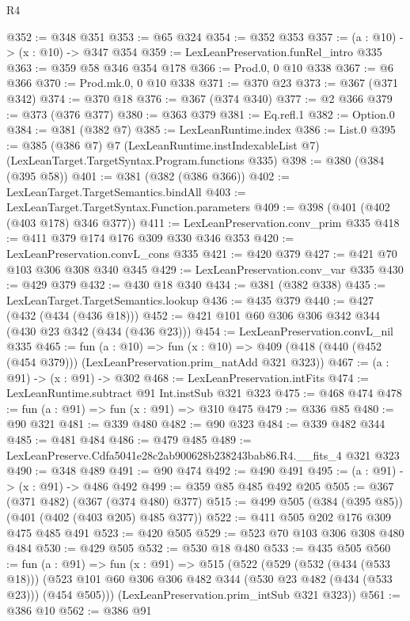 \begin{lexlean}{R4}
\begin{coremodule}
@352 := @348 @351
@353 := @65 @324
@354 := @352 @353
@357 := (a : @10) -> (x : @10) -> @347 @354
@359 := LexLeanPreservation.funRel_intro @335
@363 := @359 @58 @346 @354 @178
@366 := Prod.{0, 0} @10 @338
@367 := @6 @366
@370 := Prod.mk.{0, 0} @10 @338
@371 := @370 @23
@373 := @367 (@371 @342)
@374 := @370 @18
@376 := @367 (@374 @340)
@377 := @2 @366
@379 := @373 (@376 @377)
@380 := @363 @379
@381 := Eq.refl.{1}
@382 := Option.{0}
@384 := @381 (@382 @7)
@385 := LexLeanRuntime.index
@386 := List.{0}
@395 := @385
    (@386 @7)
    @7
    (LexLeanRuntime.instIndexableList @7)
    (LexLeanTarget.TargetSyntax.Program.functions @335)
@398 := @380 (@384 (@395 @58))
@401 := @381 (@382 (@386 @366))
@402 := LexLeanTarget.TargetSemantics.bindAll
@403 := LexLeanTarget.TargetSyntax.Function.parameters
@409 := @398 (@401 (@402 (@403 @178) @346 @377))
@411 := LexLeanPreservation.conv_prim @335
@418 := @411 @379 @174 @176 @309 @330 @346 @353
@420 := LexLeanPreservation.convL_cons @335
@421 := @420 @379
@427 := @421 @70 @103 @306 @308 @340 @345
@429 := LexLeanPreservation.conv_var @335
@430 := @429 @379
@432 := @430 @18 @340
@434 := @381 (@382 @338)
@435 := LexLeanTarget.TargetSemantics.lookup
@436 := @435 @379
@440 := @427 (@432 (@434 (@436 @18)))
@452 := @421 @101 @60 @306 @306 @342 @344 (@430 @23 @342 (@434 (@436 @23)))
@454 := LexLeanPreservation.convL_nil @335
@465 := fun (a : @10) =>
  fun (x : @10) => @409 (@418 (@440 (@452 (@454 @379))) (LexLeanPreservation.prim_natAdd @321 @323))
@467 := (a : @91) -> (x : @91) -> @302
@468 := LexLeanPreservation.intFits
@474 := LexLeanRuntime.subtract @91 Int.instSub @321 @323
@475 := @468 @474
@478 := fun (a : @91) => fun (x : @91) => @310 @475
@479 := @336 @85
@480 := @90 @321
@481 := @339 @480
@482 := @90 @323
@484 := @339 @482 @344
@485 := @481 @484
@486 := @479 @485
@489 := LexLeanPreserve.Cdfa5041e28c2ab900628b238243bab86.R4.__fits_4 @321 @323
@490 := @348 @489
@491 := @90 @474
@492 := @490 @491
@495 := (a : @91) -> (x : @91) -> @486 @492
@499 := @359 @85 @485 @492 @205
@505 := @367 (@371 @482) (@367 (@374 @480) @377)
@515 := @499 @505 (@384 (@395 @85)) (@401 (@402 (@403 @205) @485 @377))
@522 := @411 @505 @202 @176 @309 @475 @485 @491
@523 := @420 @505
@529 := @523 @70 @103 @306 @308 @480 @484
@530 := @429 @505
@532 := @530 @18 @480
@533 := @435 @505
@560 := fun (a : @91) =>
  fun (x : @91) =>
  @515
    (@522
      (@529
        (@532 (@434 (@533 @18)))
        (@523 @101 @60 @306 @306 @482 @344 (@530 @23 @482 (@434 (@533 @23))) (@454 @505)))
      (LexLeanPreservation.prim_intSub @321 @323))
@561 := @386 @10
@562 := @386 @91

\end{coremodule}
\end{lexlean}
